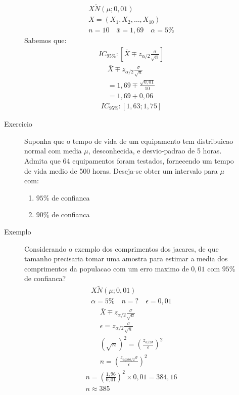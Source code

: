\begin{description}
\begin{description}
        \begin{align*}
         X \tilde N \left(\mu ; 0,01\right)  \\
         X= \left(X_1 , X_2 , \ldots , X_10\right) \\
         n=10 \quad \bar{x}=1,69 \quad \alpha= 5\% 
        \end{align*}
        Sabemos que:
        \begin{align*}
          IC_{95\%} : \left[ \bar{X} \mp z_{\alpha/2}  \frac{\sigma}{\sqrt{n}}\right] 
        \end{align*}
        \begin{align*}
          \bar{X}  \mp z_{\alpha/2} \frac{\sigma}{\sqrt{n}} \\
          = 1,69 \mp \frac{\sqrt{0,01}}{10}\\
          =1,69 + 0,06
        \end{align*}
        \begin{align*}
          IC_{95\%} : \left[ 1,63 ; 1,75\right]
        \end{align*}
      \item[Exercicio] Suponha que o tempo de vida de um equipamento tem distribuicao normal com media $\mu$, desconhecida,
        e desvio-padrao de 5 horas. Admita que $64$ equipamentos foram testados, fornecendo um tempo de vida medio de 500 horas. 
        Deseja-se obter um intervalo para $\mu$ com:
        \begin{enumerate}[label=(\alph*)]
          \item $95\%$ de confianca
          \item $90\%$ de confianca
        \end{enumerate}
      \item [Exemplo] Considerando o exemplo dos comprimentos dos jacares, de que tamanho precisaria tomar uma amostra para estimar a media dos comprimentos da populacao  com um erro maximo de $0,01$ com $95\%$ de confianca?
        \begin{align*}
          X \tilde N \left(\mu ; 0,01\right)\\
          \alpha= 5\% \quad n=? \quad \epsilon=0,01  
        \end{align*}
        \begin{align*}
          \bar{X} \mp z_{\alpha/2} \frac{\sigma}{\sqrt{n}} \\
          \epsilon = z_{\alpha/2} \frac{\sigma}{\sqrt{n}} \\
          \left(\sqrt{n}\right)^2= \left( \frac{z_{\alpha/2 \sigma}}{\epsilon}\right)^2\\
          n= \left(\frac{z_{alpha/2}\sigma}{\epsilon}\right)^2
        \end{align*}
        \begin{align*}
         n= \left(\frac{1,96}{0,01}\right)^2 \times 0,01= 384,16\\
         n \approx 385
        \end{align*}
      \end{description}
\end{description}
